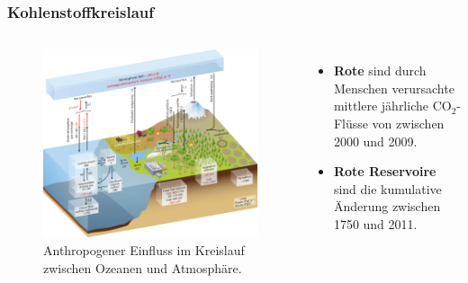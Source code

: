 \begin{frame}
	\frametitle{Kohlenstoffkreislauf}
	\begin{columns}
		\begin{figure}
			\centering
			\includegraphics[width=0.9\linewidth]{bilder/kohlenstoff/cycle_antropogenic-ocean-and-atmosphere.png}
			\caption{Anthropogener Einfluss im Kreislauf zwischen Ozeanen und Atmosphäre.}
		\end{figure}
		\begin{itemize}
			\item \color{red}\textbf{Rote \rightarrow} \color{black} sind durch Menschen verursachte mittlere jährliche CO$_2$-Flüsse von zwischen 2000 und 2009.
			\item \color{red}\textbf{Rote Reservoire} \color{black} sind die kumulative Änderung zwischen 1750 und 2011.
		\end{itemize}
	\end{columns}
\end{frame}

